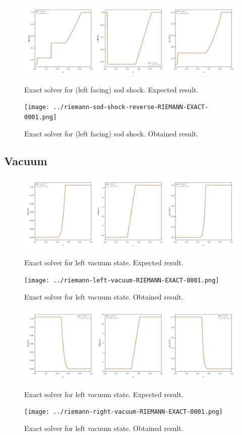 \begin{figure}[htbp]
    \centering
	\includegraphics[width=.9\textwidth]{./figures/riemann-sod-shock-reverse-RIEMANN-EXACT-overplotted.png}%
	\caption{Exact solver for (left facing) sod shock. Expected result.}
	\texttt{[image: ../riemann-sod-shock-reverse-RIEMANN-EXACT-0001.png]}%
	\caption{Exact solver for (left facing) sod shock. Obtained result.}
\end{figure}












\clearpage
\subsection{Vacuum}


\begin{figure}[htbp]
    \centering
	\includegraphics[width=.9\textwidth]{./figures/riemann-left-vacuum-RIEMANN-EXACT-overplotted.png}%
	\caption{Exact solver for left vacuum state. Expected result.}
	\texttt{[image: ../riemann-left-vacuum-RIEMANN-EXACT-0001.png]}
	\caption{Exact solver for left vacuum state. Obtained result.}
\end{figure}


\begin{figure}[htbp]
    \centering
	\includegraphics[width=.9\textwidth]{./figures/riemann-right-vacuum-RIEMANN-EXACT-overplotted.png}%
	\caption{Exact solver for left vacuum state. Expected result.}
	\texttt{[image: ../riemann-right-vacuum-RIEMANN-EXACT-0001.png]}
	\caption{Exact solver for left vacuum state. Obtained result.}
\end{figure}


